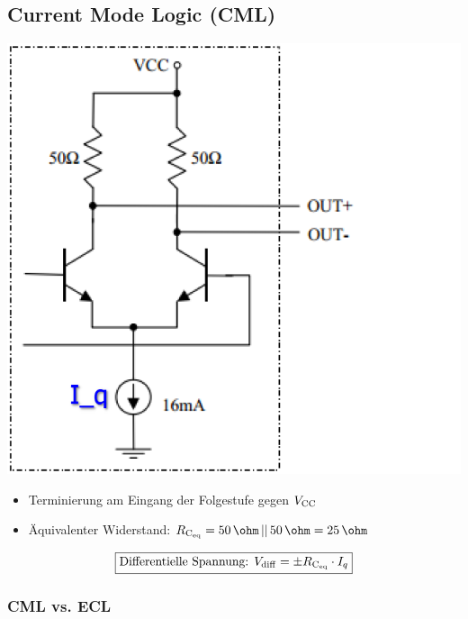 \subsection{Current Mode Logic (CML)}

\begin{minipage}[c]{0.39\columnwidth}
    \includegraphics[width=\columnwidth]{images/CML.png}
\end{minipage}
\hfill
\begin{minipage}[c]{0.59\columnwidth}
   \begin{itemize}
    \item Terminierung am Eingang der Folgestufe gegen $V_{\rm CC}$
    \item Äquivalenter Widerstand: $R_{\rm C_{\rm eq}} = 50 \, \ohm \, || \, 50 \, \ohm = 25 \, \ohm$
    
   \end{itemize}
\end{minipage}
    $$ \boxed{ \text{Differentielle Spannung: } V_{\rm diff} = \pm R_{\rm C_{\rm eq}} \cdot I_q }$$


\subsubsection{CML vs. ECL}


